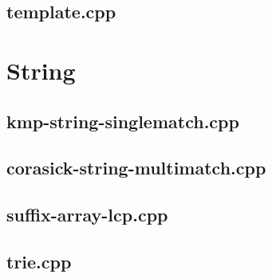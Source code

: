 \documentclass[10pt,twocolumn,landscape]{article}
\begin{document}
\subsection{template.cpp}


\section{String}

\subsection{kmp-string-singlematch.cpp}


\subsection{corasick-string-multimatch.cpp}


\subsection{suffix-array-lcp.cpp}


\subsection{trie.cpp}

\end{document}
